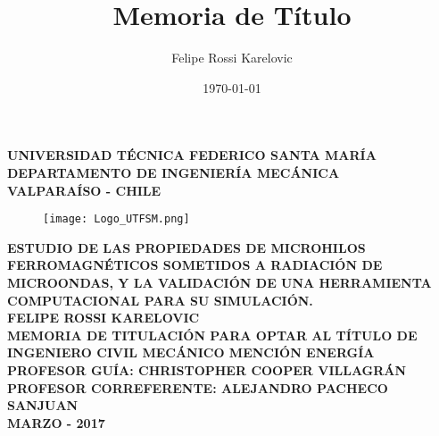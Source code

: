 \documentclass[12pt,letterpaper]{report}
\title{Memoria de Título}
\author{Felipe Rossi Karelovic}
\date{\today}
\numberwithin{equation}{section}
\begin{document}
\begin{titlepage}
	
	\begin{center}
		\vspace*{-1in}
		
		\Large \textbf{UNIVERSIDAD TÉCNICA FEDERICO SANTA MARÍA}\\
		\vspace*{0.15in}
		\large \textbf{DEPARTAMENTO DE INGENIERÍA MECÁNICA} \\
		\vspace*{0.15in}
		\textbf{VALPARAÍSO - CHILE}
		
		\begin{figure}[h!]
			\centering\texttt{[image: Logo\_UTFSM.png]}
		\end{figure}
		\vspace*{0.15in}
		\Large \textbf{ESTUDIO DE LAS PROPIEDADES DE MICROHILOS FERROMAGNÉTICOS SOMETIDOS A RADIACIÓN DE MICROONDAS, Y LA VALIDACIÓN DE UNA HERRAMIENTA COMPUTACIONAL PARA SU SIMULACIÓN.}\\
		\vspace*{1in}
		\large\centering \textbf{FELIPE ROSSI KARELOVIC}\\
		\vspace*{0.15in}
		\centering\normalsize \textbf{MEMORIA DE TITULACIÓN PARA OPTAR AL TÍTULO DE INGENIERO CIVIL MECÁNICO MENCIÓN ENERGÍA}\\
		\vspace*{0.6in}
		\centering\normalsize \textbf{PROFESOR GUÍA: \hspace{2.5cm} CHRISTOPHER COOPER VILLAGRÁN}\\
		\vspace*{0.15in}
		\centering\normalsize \textbf{PROFESOR CORREFERENTE: \hspace{1cm} ALEJANDRO PACHECO SANJUAN}\\
		\vspace*{1in}
		\centering\normalsize \textbf{MARZO - 2017}\\



	\end{center}
	
\end{titlepage}
\newpage\null\thispagestyle{empty}\newpage
\end{document}
